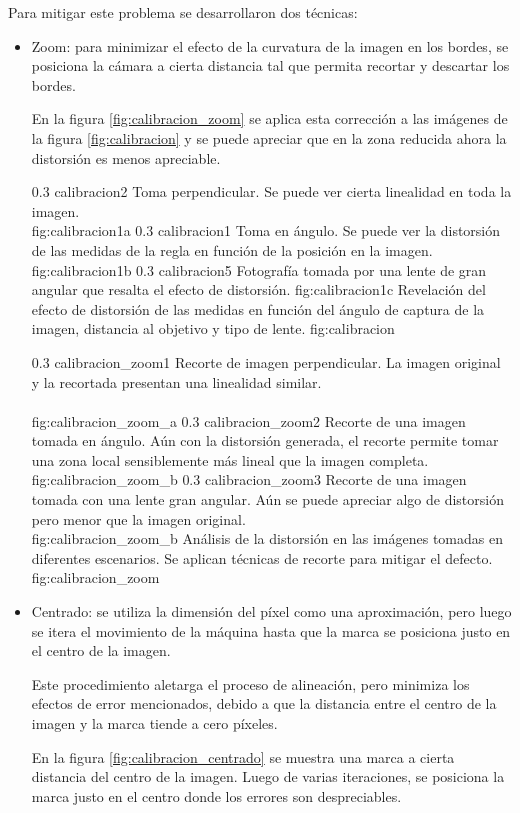 Para mitigar este problema se desarrollaron dos técnicas:
\begin{itemize}
\item{Zoom: para minimizar el efecto de la curvatura de la imagen en los bordes, se posiciona la cámara a cierta distancia tal que permita recortar y descartar los bordes.\par
      En la figura \ref{fig:calibracion_zoom} se aplica esta corrección a las imágenes de la figura \ref{fig:calibracion} y se puede apreciar que en la zona reducida ahora la distorsión es menos apreciable.}

\subfigabc
   {0.3} {calibracion2} {Toma perpendicular. Se puede ver cierta linealidad en toda la imagen.\\ \vphantom{1}} {fig:calibracion1a}
   {0.3} {calibracion1} {Toma en ángulo. Se puede ver la distorsión de las medidas de la regla en función de la posición en la imagen.} {fig:calibracion1b}
   {0.3} {calibracion5} {Fotografía tomada por una lente de gran angular que resalta el efecto de distorsión.} {fig:calibracion1c}
   {Revelación del efecto de distorsión de las medidas en función del ángulo de captura de la imagen, distancia al objetivo y tipo de lente.}
   {fig:calibracion}

\subfigabc
{0.3} {calibracion_zoom1} {Recorte de imagen perpendicular. La imagen original y la recortada presentan una linealidad similar.\\ \vphantom{1}\\ \vphantom{1}} {fig:calibracion_zoom_a}
   {0.3} {calibracion_zoom2} {Recorte de una imagen tomada en ángulo. Aún con la distorsión generada, el recorte permite tomar una zona local sensiblemente más lineal que la imagen completa.} {fig:calibracion_zoom_b}
   {0.3} {calibracion_zoom3} {Recorte de una imagen tomada con una lente gran angular. Aún se puede apreciar algo de distorsión pero menor que la imagen original.\\ \vphantom{1}} {fig:calibracion_zoom_b}
   {Análisis de la distorsión en las imágenes tomadas en diferentes escenarios. Se aplican técnicas de recorte para mitigar el defecto.}
   {fig:calibracion_zoom}

   \item{Centrado: se utiliza la dimensión del píxel como una aproximación, pero luego se itera el movimiento de la máquina hasta que la marca se posiciona justo en el centro de la imagen.\par
         Este procedimiento aletarga el proceso de alineación, pero minimiza los efectos de error mencionados, debido a que la distancia entre el centro de la imagen y la marca tiende a cero píxeles.\par
         En la figura \ref{fig:calibracion_centrado} se muestra una marca a cierta distancia del centro de la imagen. Luego de varias iteraciones, se posiciona la marca justo en el centro donde los errores son despreciables.}
   \end{itemize}

